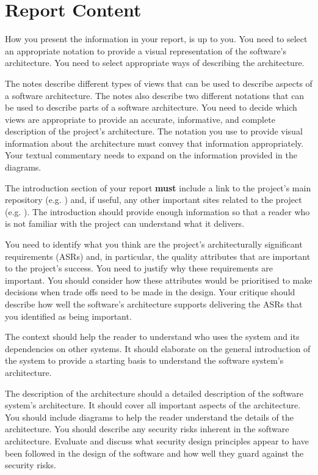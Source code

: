 \documentclass{csse4400}
\begin{document}
\section{Report Content}
How you present the information in your report, is up to you. You need to select an appropriate notation 
to provide a visual representation of the software's architecture. You need to select appropriate ways of describing
the architecture.

The  notes
describe different types of views that can be used to describe aspects of a software architecture.
The notes also describe two different notations that can be used to describe parts of a software architecture.
You need to decide which views are appropriate to provide an accurate, informative, and complete description of the project's architecture.
The notation you use to provide visual information about the architecture must convey that information appropriately.
Your textual commentary needs to expand on the information provided in the diagrams.

The introduction section of your report \textbf{must} include a link to the project's main repository
(e.g. )
and, if useful, any other important sites related to the project
(e.g. ).
The introduction should provide enough information so that a reader who is not familiar with the project can understand what it delivers.

You need to identify what you think are the project's architecturally significant requirements (ASRs)
and, in particular, the quality attributes that are important to the project's success.
You need to justify why these requirements are important.
You should consider how these attributes would be prioritised to make decisions when trade offs need to be made in the design.
Your critique should describe how well the software's architecture supports delivering the ASRs that you identified as being important.

The context should help the reader to understand who uses the system and its dependencies on other systems.
It should elaborate on the general introduction of the system to provide a starting basis to understand the software system's architecture.

The description of the architecture should a detailed description of the software system's architecture.
It should cover all important aspects of the architecture.
You should include diagrams to help the reader understand the details of the architecture.
You should describe any security risks inherent in the software architecture.
Evaluate and discuss what security design principles appear to have been followed in the design of the software and how well they guard against the security risks.
\end{document}
